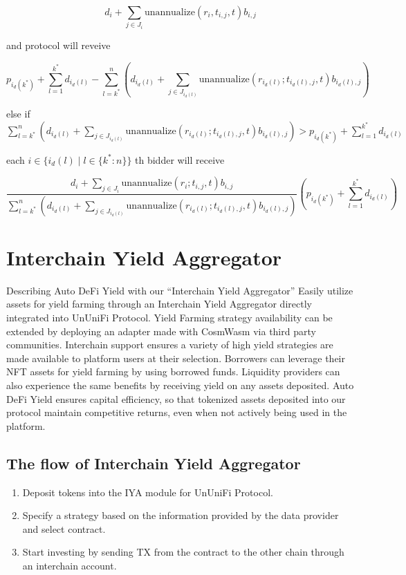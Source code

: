 \documentclass[dvipdfmx]{jsarticle}
\begin{document}
$$
  d_i + \sum_{j \in J_i} \text{unannualize}(r_i, t_{i,j}, t) b_{i,j}
$$

and protocol will reveive

$$
  p_{i_d(k^*)} + \sum_{l=1}^{k^*} d_{i_d(l)} - \sum_{l=k^*}^n \left(d_{i_d(l)} + \sum_{j \in J_{i_d(l)}} \text{unannualize}(r_{i_d(l)}; t_{i_d(l),j}, t) b_{i_d(l),j} \right)
$$

else if $\sum_{l=k^*}^n \left(d_{i_d(l)} + \sum_{j \in J_{i_d(l)}} \text{unannualize}(r_{i_d(l)}; t_{i_d(l),j}, t) b_{i_d(l),j} \right) > p_{i_d(k^*)} + \sum_{l=1}^{k^*} d_{i_d(l)}$

each $i \in \{i_d(l) \mid l \in \{k^*:n\}\}$ th bidder will receive

$$
  \frac{d_i + \sum_{j \in J_i} \text{unannualize}(r_i; t_{i,j}, t) b_{i,j}}{\sum_{l=k^*}^n \left(d_{i_d(l)} + \sum_{j \in J_{i_d(l)}} \text{unannualize}(r_{i_d(l)}; t_{i_d(l),j}, t) b_{i_d(l),j} \right)} \left( p_{i_d(k^*)} + \sum_{l=1}^{k^*} d_{i_d(l)} \right)
$$

\section{Interchain Yield Aggregator}

Describing Auto DeFi Yield with our “Interchain Yield Aggregator”
Easily utilize assets for yield farming through an Interchain Yield Aggregator directly integrated into UnUniFi Protocol. 
Yield Farming strategy availability can be extended by deploying an adapter made with CosmWasm via third party communities. 
Interchain support ensures a variety of high yield strategies are made available to platform users at their selection. 
Borrowers can leverage their NFT assets for yield farming by using borrowed funds. 
Liquidity providers can also experience the same benefits by receiving yield on any assets deposited. 
Auto DeFi Yield ensures capital efficiency, so that tokenized assets deposited into our protocol maintain competitive returns, even when not actively being used in the platform.

\subsection{The flow of Interchain Yield Aggregator}
\begin{enumerate}
  \item Deposit tokens into the IYA module for UnUniFi Protocol.
  \item Specify a strategy based on the information provided by the data provider and select contract.
  \item Start investing by sending TX from the contract to the other chain through an interchain account.
\end{enumerate}
\end{document}
